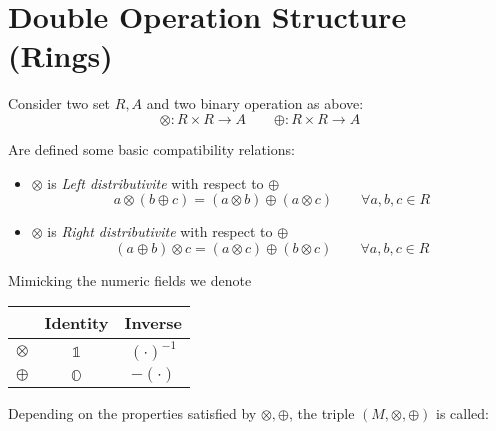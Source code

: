 \documentclass[a4paper,12pt]{scrartcl}    %
\newcommand{\OpA}{\otimes}
\newcommand{\OpB}{\oplus}
\begin{document}
\newpage
\section{Double Operation Structure (Rings)}
Consider two set $R, A$ and two binary operation as above:
\begin{displaymath}
		\OpA : R \times R \rightarrow A \qquad 	\OpB : R \times R \rightarrow A
\end{displaymath}

Are defined some basic compatibility relations:
\begin{itemize}
\item $\OpA$ is \emph{Left distributivite} with respect to $\OpB$
	\begin{equation}\label{LeftDistributivity}
		a \OpA ( b \OpB c) = (a \OpA b) \OpB (a \OpA c) \qquad \forall a,b,c \in R
	\end{equation}
\item  $\OpA$ is \emph{Right distributivite} with respect to $\OpB$
	\begin{equation}\label{RightDistributivity}
		( a \OpB b)\OpA c = (a \OpA c) \OpB (b \OpA c) \qquad \forall a,b,c \in R	
	\end{equation}
\end{itemize}
\begin{notationfix}
	Mimicking the numeric fields we denote
	\begin{tabular}{|c|c c|}
		\hline 
			& Identity & Inverse \\
		\hline
		$\OpA$ & $\mathbb{1}$ & $(\cdot)^{-1}$\\
		$\OpB$ & $\mathbb{O}$ & $-(\cdot)$\\
		\hline
	\end{tabular}

\end{notationfix}

Depending on the properties satisfied by $\OpA,\OpB$, the triple $(M,\OpA,\OpB)$ is called:
\end{document}
